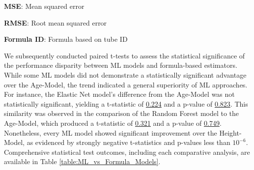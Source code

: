 \documentclass[11pt]{article}
\begin{document}
\begin{table}[h]
\caption{\protect\hyperlink{file-table-2-pkl}{Formula based models performance comparison.}}
\label{table:Formula_Model_Performance}
\begin{threeparttable}
\renewcommand{\TPTminimum}{\linewidth}
\begin{tablenotes}
\footnotesize
\item \textbf{MSE}: Mean squared error
\item \textbf{RMSE}: Root mean squared error
\item \textbf{Formula ID}: Formula based on tube ID
\end{tablenotes}
\end{threeparttable}
\end{table}

We subsequently conducted paired t-tests to assess the statistical significance of the performance disparity between ML models and formula-based estimators. While some ML models did not demonstrate a statistically significant advantage over the Age-Model, the trend indicated a general superiority of ML approaches. For instance, the Elastic Net model's difference from the Age-Model was not statistically significant, yielding a t-statistic of \hyperlink{C4b}{0.224} and a p-value of \hyperlink{C4c}{0.823}. This similarity was observed in the comparison of the Random Forest model to the Age-Model, which produced a t-statistic of \hyperlink{C1b}{0.321} and a p-value of \hyperlink{C1c}{0.749}. Nonetheless, every ML model showed significant improvement over the Height-Model, as evidenced by strongly negative t-statistics and p-values less than \hyperlink{C0c}{$10^{-6}$}. Comprehensive statistical test outcomes, including each comparative analysis, are available in Table \ref{table:ML_vs_Formula_Models}.
\end{document}
